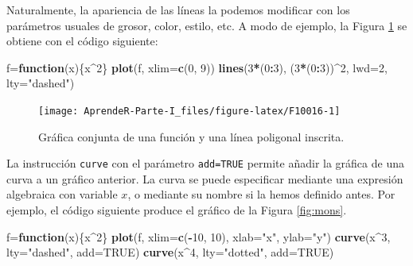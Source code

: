 \documentclass[]{book}
\newenvironment{Shaded}{\begin{snugshade}}{\end{snugshade}}
\newcommand{\ControlFlowTok}[1]{\textcolor[rgb]{0.13,0.29,0.53}{\textbf{#1}}}
\newcommand{\DataTypeTok}[1]{\textcolor[rgb]{0.13,0.29,0.53}{#1}}
\newcommand{\DecValTok}[1]{\textcolor[rgb]{0.00,0.00,0.81}{#1}}
\newcommand{\KeywordTok}[1]{\textcolor[rgb]{0.13,0.29,0.53}{\textbf{#1}}}
\newcommand{\NormalTok}[1]{#1}
\newcommand{\OperatorTok}[1]{\textcolor[rgb]{0.81,0.36,0.00}{\textbf{#1}}}
\newcommand{\OtherTok}[1]{\textcolor[rgb]{0.56,0.35,0.01}{#1}}
\newcommand{\StringTok}[1]{\textcolor[rgb]{0.31,0.60,0.02}{#1}}
\theoremstyle{definition}
\theoremstyle{definition}
\theoremstyle{definition}
\theoremstyle{remark}
\begin{document}
Naturalmente, la apariencia de las líneas la podemos modificar con los parámetros usuales de grosor, color, estilo, etc. A modo de ejemplo, la Figura \ref{fig:F10016} se obtiene con el código siguiente:

\begin{Shaded}
\begin{Highlighting}[]
\NormalTok{f=}\ControlFlowTok{function}\NormalTok{(x)\{x}\OperatorTok{^}\DecValTok{2}\NormalTok{\}}
\KeywordTok{plot}\NormalTok{(f, }\DataTypeTok{xlim=}\KeywordTok{c}\NormalTok{(}\DecValTok{0}\NormalTok{, }\DecValTok{9}\NormalTok{))}
\KeywordTok{lines}\NormalTok{(}\DecValTok{3}\OperatorTok{*}\NormalTok{(}\DecValTok{0}\OperatorTok{:}\DecValTok{3}\NormalTok{), (}\DecValTok{3}\OperatorTok{*}\NormalTok{(}\DecValTok{0}\OperatorTok{:}\DecValTok{3}\NormalTok{))}\OperatorTok{^}\DecValTok{2}\NormalTok{, }\DataTypeTok{lwd=}\DecValTok{2}\NormalTok{, }\DataTypeTok{lty=}\StringTok{"dashed"}\NormalTok{)}
\end{Highlighting}
\end{Shaded}

\begin{figure}

{\centering \texttt{[image: AprendeR-Parte-I\_files/figure-latex/F10016-1]} 

}

\caption{Gráfica conjunta de una función y una línea poligonal inscrita.}\label{fig:F10016}
\end{figure}

La instrucción \texttt{curve} con el parámetro \texttt{add=TRUE} permite añadir la gráfica de una curva a un gráfico anterior. La curva se puede especificar mediante una expresión algebraica con variable \(x\), o mediante su nombre si la hemos definido antes. Por ejemplo, el código siguiente produce el gráfico de la Figura \ref{fig:mons}.

\begin{Shaded}
\begin{Highlighting}[]
\NormalTok{f=}\ControlFlowTok{function}\NormalTok{(x)\{x}\OperatorTok{^}\DecValTok{2}\NormalTok{\}}
\KeywordTok{plot}\NormalTok{(f, }\DataTypeTok{xlim=}\KeywordTok{c}\NormalTok{(}\OperatorTok{-}\DecValTok{10}\NormalTok{, }\DecValTok{10}\NormalTok{), }\DataTypeTok{xlab=}\StringTok{"x"}\NormalTok{, }\DataTypeTok{ylab=}\StringTok{"y"}\NormalTok{)}
\KeywordTok{curve}\NormalTok{(x}\OperatorTok{^}\DecValTok{3}\NormalTok{, }\DataTypeTok{lty=}\StringTok{"dashed"}\NormalTok{, }\DataTypeTok{add=}\OtherTok{TRUE}\NormalTok{)}
\KeywordTok{curve}\NormalTok{(x}\OperatorTok{^}\DecValTok{4}\NormalTok{, }\DataTypeTok{lty=}\StringTok{"dotted"}\NormalTok{, }\DataTypeTok{add=}\OtherTok{TRUE}\NormalTok{) }
\end{Highlighting}
\end{Shaded}
\end{document}
